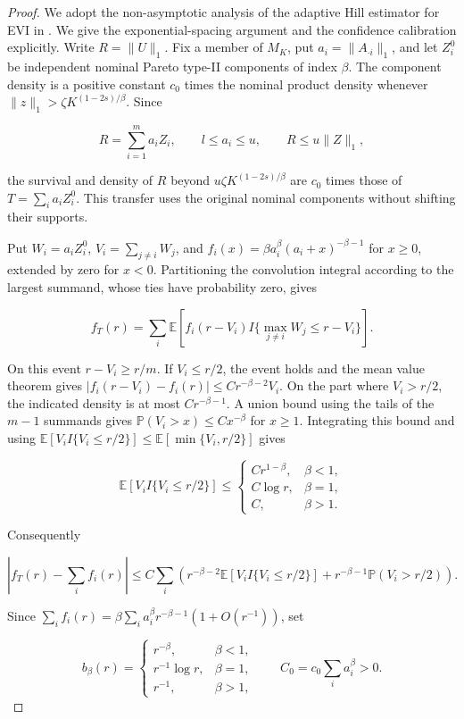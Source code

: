 \documentclass[12pt]{article}
\theoremstyle{plain}
\theoremstyle{definition}
\begin{document}
\begin{proof}
  We adopt the non-asymptotic analysis of the adaptive Hill estimator for EVI
  in {\citep{boucheron2015tail}}. We give the exponential-spacing argument and the confidence calibration explicitly. Write $R=\|U\|_1$. Fix a member of $M_K$, put $a_i=\|A_{\cdot i}\|_1$, and let $Z_i^0$ be independent nominal Pareto type-II components of index $\beta$. The component density is a positive constant $c_0$ times the nominal product density whenever $\|z\|_1>\zeta K^{(1-2s)/\beta}$. Since

\[
R=\sum_{i=1}^m a_iZ_i,\qquad l\leq a_i\leq u,\qquad R\leq u\|Z\|_1,
\]

the survival and density of $R$ beyond $u\zeta K^{(1-2s)/\beta}$ are $c_0$ times those of $T=\sum_i a_iZ_i^0$. This transfer uses the original nominal components without shifting their supports. 

Put $W_i=a_iZ_i^0$, $V_i=\sum_{j\ne i}W_j$, and $f_i(x)=\beta a_i^\beta(a_i+x)^{-\beta-1}$ for $x\geq0$, extended by zero for $x<0$. Partitioning the convolution integral according to the largest summand, whose ties have probability zero, gives

\[
f_T(r)=\sum_i\mathbb E\left[f_i(r-V_i)I\{\max_{j\ne i}W_j\leq r-V_i\}\right].
\]

On this event $r-V_i\geq r/m$. If $V_i\leq r/2$, the event holds and the mean value theorem gives $|f_i(r-V_i)-f_i(r)|\leq C r^{-\beta-2}V_i$. On the part where $V_i>r/2$, the indicated density is at most $C r^{-\beta-1}$. A union bound using the tails of the $m-1$ summands gives $\mathbb P(V_i>x)\leq Cx^{-\beta}$ for $x\geq1$. Integrating this bound and using $\mathbb E[V_iI\{V_i\leq r/2\}]\leq\mathbb E[\min\{V_i,r/2\}]$ gives

\[
\mathbb E[V_iI\{V_i\leq r/2\}]\leq
\begin{cases}Cr^{1-\beta},&\beta<1,\\ C\log r,&\beta=1,\\ C,&\beta>1.\end{cases}
\]

Consequently

\[
\left|f_T(r)-\sum_i f_i(r)\right|
\leq C\sum_i\left(r^{-\beta-2}\mathbb E[V_iI\{V_i\leq r/2\}]+r^{-\beta-1}\mathbb P(V_i>r/2)\right).
\]

Since $\sum_i f_i(r)=\beta\sum_i a_i^\beta r^{-\beta-1}(1+O(r^{-1}))$, set

\[
b_\beta(r)=\begin{cases}r^{-\beta},&\beta<1,\\r^{-1}\log r,&\beta=1,\\r^{-1},&\beta>1,\end{cases}\qquad C_0=c_0\sum_i a_i^\beta>0.
\]


\end{proof}
\end{document}
